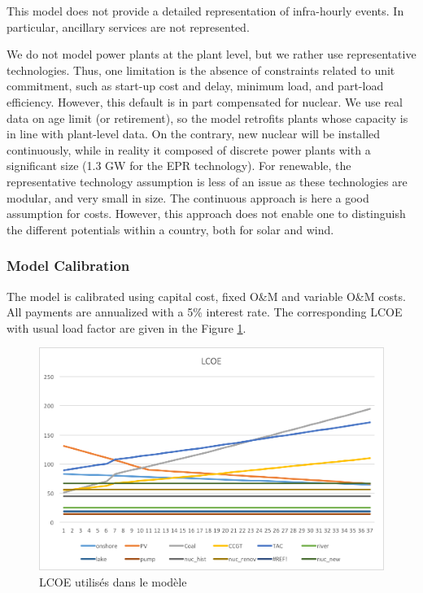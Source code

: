 This model does not provide a detailed representation of infra-hourly events. In particular, ancillary services are not represented. 

We do not model power plants at the plant level, but we rather use representative technologies. Thus, one limitation is the absence of constraints related to unit commitment, such as start-up cost and delay, minimum load, and part-load efficiency. 
However, this default is in part compensated for nuclear. We use real data on age limit (or retirement), so the model retrofits plants whose capacity is in line with plant-level data. On the contrary, new nuclear will be installed continuously, while in reality it composed of discrete power plants with a significant size (1.3 GW for the EPR technology).
For renewable, the representative technology assumption is less of an issue as these technologies are modular, and very small in size. The continuous approach is here a good assumption for costs. However, this approach does not enable one to distinguish the different potentials within a country, both for solar and wind. 


\clearpage

\subsubsection{Model Calibration}

\label{app:calibration}

The model is calibrated using capital cost, fixed O\&M and variable O\&M costs. All payments are annualized with a 5\% interest rate. The corresponding LCOE with usual load factor are given in the Figure \ref{fig:calibration_LCOE}.

\begin{figure}[!ht]
	\centering
	\includegraphics[width=12cm]{figures/calibration_LCOE.png}
	\caption{LCOE utilisés dans le modèle}
	\label{fig:calibration_LCOE}
\end{figure}

